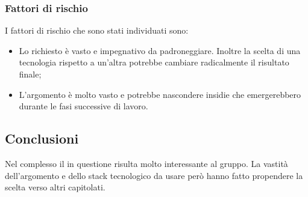 \documentclass[../StudioDiFattibilita.tex]{subfiles}
\begin{document}
			\subsubsection{Fattori di rischio}
			I fattori di rischio che sono stati individuati sono:
			\begin{itemize}
				\item Lo  richiesto è vasto e impegnativo da padroneggiare. Inoltre la scelta di una tecnologia rispetto a un'altra potrebbe cambiare radicalmente il risultato finale;
				\item L'argomento è molto vasto e potrebbe nascondere insidie che emergerebbero durante le fasi successive di lavoro.
			\end{itemize}
			\subsection{Conclusioni}
				Nel complesso il  in questione risulta molto interessante al gruppo. La vastità dell'argomento e dello stack tecnologico da usare però hanno fatto propendere la scelta verso altri capitolati.
\end{document}
